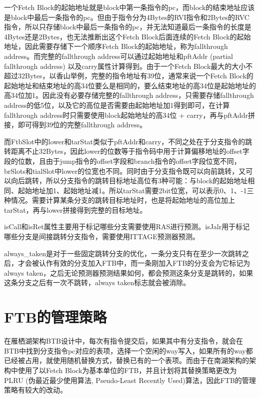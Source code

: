 一个Fetch Block的起始地址就是block中第一条指令的pc，而block的结束地址应该是block中最后一条指令的pc。但由于指令分为4Bytes的RVI指令和2Bytes的RVC指令，所以只存储block中最后一条指令的pc，并无法知道最后一条指令的长度是4Bytes还是2Bytes，也无法推断出这个Fetch Block后面连续的Fetch Block的起始地址，因此需要存储下一个顺序Fetch Block的起始地址，称为fallthrough address。而完整的fallthrough address可以通过起始地址和pftAddr (partial fallthrough address) 以及carry属性计算得到。由于一个Fetch Block最大的大小不超过32Bytes，以香山举例，完整的指令地址有39位，通常来说一个Fetch Block的起始地址和结束地址的高34位要么是相同的，要么结束地址的高34位是起始地址的高34位加1。因此没有必要存储完整的fallthrough address，只需要存储fallthrough address的低5位，以及它的高位是否需要由起始地址加1得到即可，在计算fallthrough address时只需要使用block起始地址的高34位 + carry，再与pftAddr拼接，即可得到39位的完整fallthrough address。

而FtbSlot中的lower和tarStat类似于pftAddr和carry，不同之处在于分支指令的跳转距离不止32Bytes，因此lower的位数等于指令码中用于计算偏移地址的offset字段的位数，且由于jump指令的offset字段和branch指令的offset字段位宽不同，brSlots和tialSlot中lower的位宽也不同。同时由于分支指令既可以向前跳转，又可以向后跳转，所以分支指令的跳转目标地址高位有3种可能：与block的起始地址相同、起始地址加1、起始地址减1。所以tarStat需要2bit位宽，可以表示0、1、-1三种情况。需要计算某条分支的跳转目标地址时，也是将起始地址的高位加上tarStat，再与lower拼接得到完整的目标地址。

isCall和isRet属性主要用于标记哪些分支需要使用RAS进行预测。isJalr用于标记哪些分支是间接跳转分支指令，需要使用ITTAGE预测器预测。

always\_taken是对于一些固定跳转分支的优化，一条分支只有在至少一次跳转之后，才会被认作有效的分支加入FTB中，而一条刚加入FTB的分支会为它标记为always taken，之后无论预测器预测结果如何，都会预测这条分支是跳转的，如果这条分支之后有一次不跳转，always taken标志就会被消除。

\section{FTB的管理策略}

在雁栖湖架构BTB设计中，每次有指令提交后，如果其中有分支指令，就会在BTB中找到分支指令pc对应的表项，选择一个空闲的way写入，如果所有的way都已经被占用，就使用随机替换方式，替换已有的一个表项。而由于在南湖架构的架构中使用了以Fetch Block为基本单位的FTB，并且计划将其替换策略更改为PLRU (伪最近最少使用算法, Pseudo-Least Recently Used)算法，因此FTB的管理策略有较大的改动。

